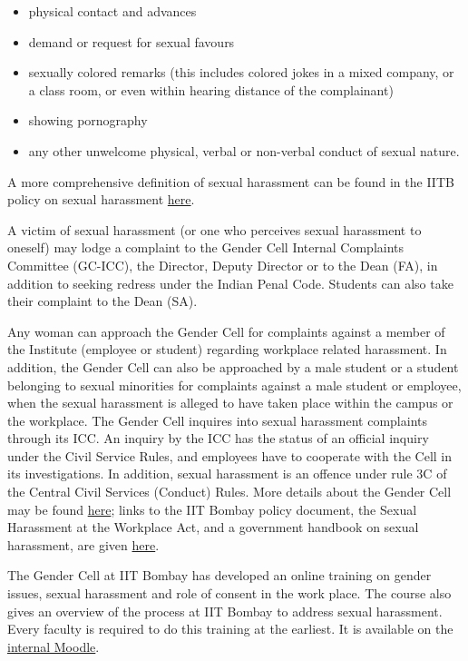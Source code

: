 \documentclass[
  10pt,
  a5paper,
  10pt,
  openany]{amsbook}
\providecommand{\tightlist}{%
  \setlength{\itemsep}{0pt}\setlength{\parskip}{0pt}}
\begin{document}
\begin{itemize}
\tightlist
\item
  physical contact and advances
\item
  demand or request for sexual favours
\item
  sexually colored remarks (this includes colored jokes in a mixed
  company, or a class room, or even within hearing distance of the
  complainant)
\item
  showing pornography
\item
  any other unwelcome physical, verbal or non-verbal conduct of sexual
  nature.
\end{itemize}

A more comprehensive definition of sexual harassment can be found in the
IITB policy on sexual harassment
\href{https://www.gendercell.iitb.ac.in/policy.pdf}{here}.

A victim of sexual harassment (or one who perceives sexual harassment to
oneself) may lodge a complaint to the Gender Cell Internal Complaints
Committee (GC-ICC), the Director, Deputy Director or to the Dean (FA),
in addition to seeking redress under the Indian Penal Code. Students can
also take their complaint to the Dean (SA).

Any woman can approach the Gender Cell for complaints against a member
of the Institute (employee or student) regarding workplace related
harassment. In addition, the Gender Cell can also be approached by a
male student or a student belonging to sexual minorities for complaints
against a male student or employee, when the sexual harassment is
alleged to have taken place within the campus or the workplace. The
Gender Cell inquires into sexual harassment complaints through its ICC.
An inquiry by the ICC has the status of an official inquiry under the
Civil Service Rules, and employees have to cooperate with the Cell in
its investigations. In addition, sexual harassment is an offence under
rule 3C of the Central Civil Services (Conduct) Rules. More details
about the Gender Cell may be found
\href{http://www.gendercell.iitb.ac.in/}{here}; links to the IIT Bombay
policy document, the Sexual Harassment at the Workplace Act, and a
government handbook on sexual harassment, are given
\href{https://www.gendercell.iitb.ac.in/icc.html}{here}.

The Gender Cell at IIT Bombay has developed an online training on gender
issues, sexual harassment and role of consent in the work place. The
course also gives an overview of the process at IIT Bombay to address
sexual harassment. Every faculty is required to do this training at the
earliest. It is available on the
\href{https://xmoodle.iitb.ac.in/course/view.php?id=13}{internal
Moodle}.
\end{document}
